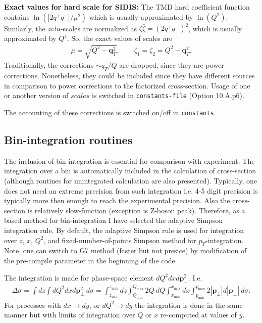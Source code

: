 \documentclass[prd,nofootinbib,eqsecnum,final]{revtex4}
\renewcommand{\(}{\left(}
\renewcommand{\)}{\right)}
\renewcommand{\[}{\left[}
\renewcommand{\]}{\right]}
\renewcommand{\vec}[1]{\bm{#1}}
\begin{document}
\textbf{Exact values for hard scale for SIDIS:} The TMD hard coefficient function contains $\ln(|2q^+q^-|/\mu^2)$ which is usually approximated by $\ln(Q^2)$. Similarly, the $zeta$-scales are normalized as $\zeta \bar \zeta=(2q^+q^-)^2$, which is usually approximated by $Q^4$. So, the exact values of scales are
\begin{eqnarray}
\mu=\sqrt{Q^2-\vec q_T^2},\qquad \zeta_1=\zeta_2=Q^2-\vec q_T^2.
\end{eqnarray}
Traditionally, the corrections $\sim q_T/Q$ are dropped, since they are power corrections. Nonetheless, they could be included since they have different sources in comparison to power corrections to the factorized cross-section. Usage of one or another version of $scales$ is switched in \texttt{constants-file} (Option 10.A.p6).

The accounting of these corrections is switched on/off in \texttt{constants}. 

\subsection{Bin-integration routines}

The inclusion of bin-integration is essential for comparison with experiment. The integration over a bin is automatically included in the calculation of cross-section (although routines for unintegrated calculation are also presented). Typically, one does not need an extreme precision from such integration i.e. 4-5 digit precision is typically more then enough to reach the experimental precision. Also the cross-section is relatively slow-function (exception is Z-boson peak). Therefore, as a based method for bin-integration I have selected the adaptive Simpson integration rule. By default, the adaptive Simpson rule is used for integration over $z$, $x$, $Q^2$, and fixed-number-of-points Simpson method for $p_T$-integration. Note, one can switch to G7 method (faster but not presice) by modification of the pre-compile parameter in the beginning of the code.

The integration is made for phase-space element $dQ^2 dx d\vec p_\perp^2$. I.e.
\begin{eqnarray}
\Delta \sigma =\int dz \int dQ^2 dx d\vec p_\perp^2~ d\sigma
=\int_{z_{\min}}^{z_{\max}} dz\int_{Q_{\min}}^{Q_{\max}} 2Q~ dQ \int_{x_{\min}}^{x_{\max}} dx \int_{p_{\min}}^{p_{\max}} 2|\vec p_\perp|d|\vec p_\perp|~ d\sigma.
\end{eqnarray}
For processes with $dx\to dy$, or $dQ^2\to dy$ the integration is done in the same manner but with limits of integration over $Q$ or $x$ re-computed at values of $y$.
\end{document}
